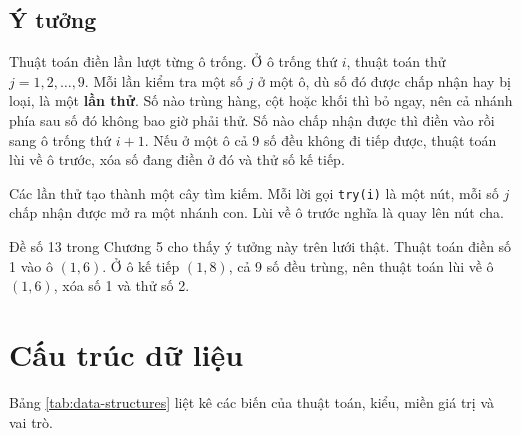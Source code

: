 \subsection*{Ý tưởng}

Thuật toán điền lần lượt từng ô trống. Ở ô trống thứ \(i\), thuật toán thử \(j = 1, 2, \ldots, 9\). Mỗi lần kiểm tra một số \(j\) ở một ô, dù số đó được chấp nhận hay bị loại, là một \textbf{lần thử}. Số nào trùng hàng, cột hoặc khối thì bỏ ngay, nên cả nhánh phía sau số đó không bao giờ phải thử. Số nào chấp nhận được thì điền vào rồi sang ô trống thứ \(i + 1\). Nếu ở một ô cả 9 số đều không đi tiếp được, thuật toán lùi về ô trước, xóa số đang điền ở đó và thử số kế tiếp.

Các lần thử tạo thành một cây tìm kiếm. Mỗi lời gọi \texttt{try(i)} là một nút, mỗi số \(j\) chấp nhận được mở ra một nhánh con. Lùi về ô trước nghĩa là quay lên nút cha.

Đề số 13 trong Chương 5 cho thấy ý tưởng này trên lưới thật. Thuật toán điền số 1 vào ô \((1, 6)\). Ở ô kế tiếp \((1, 8)\), cả 9 số đều trùng, nên thuật toán lùi về ô \((1, 6)\), xóa số 1 và thử số 2.

\section{Cấu trúc dữ liệu}

Bảng \ref{tab:data-structures} liệt kê các biến của thuật toán, kiểu, miền giá trị và vai trò.

